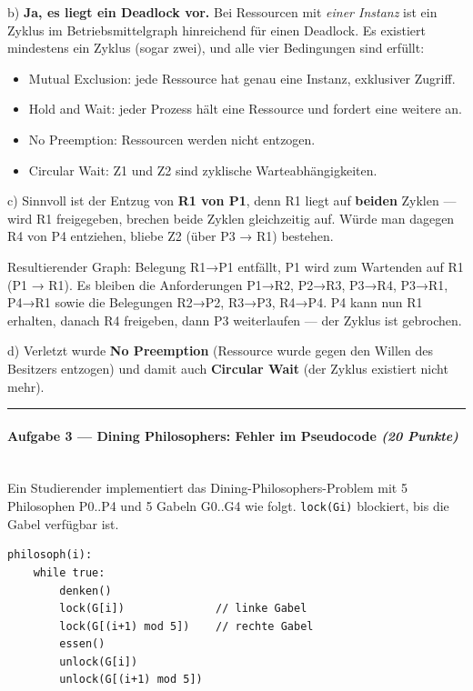 \documentclass[11pt, a4paper]{article}
\begin{document}
b) \textbf{Ja, es liegt ein Deadlock vor.} Bei Ressourcen mit \textit{einer Instanz} ist ein Zyklus im Betriebsmittelgraph hinreichend für einen Deadlock. Es existiert mindestens ein Zyklus (sogar zwei), und alle vier Bedingungen sind erfüllt:

\begin{itemize}
  \item Mutual Exclusion: jede Ressource hat genau eine Instanz, exklusiver Zugriff.
  \item Hold and Wait: jeder Prozess hält eine Ressource und fordert eine weitere an.
  \item No Preemption: Ressourcen werden nicht entzogen.
  \item Circular Wait: Z1 und Z2 sind zyklische Warteabhängigkeiten.
\end{itemize}

c) Sinnvoll ist der Entzug von \textbf{R1 von P1}, denn R1 liegt auf \textbf{beiden} Zyklen — wird R1 freigegeben, brechen beide Zyklen gleichzeitig auf. Würde man dagegen R4 von P4 entziehen, bliebe Z2 (über P3 → R1) bestehen.


Resultierender Graph: Belegung R1→P1 entfällt, P1 wird zum Wartenden auf R1 (P1 → R1). Es bleiben die Anforderungen P1→R2, P2→R3, P3→R4, P3→R1, P4→R1 sowie die Belegungen R2→P2, R3→P3, R4→P4. P4 kann nun R1 erhalten, danach R4 freigeben, dann P3 weiterlaufen — der Zyklus ist gebrochen.


d) Verletzt wurde \textbf{No Preemption} (Ressource wurde gegen den Willen des Besitzers entzogen) und damit auch \textbf{Circular Wait} (der Zyklus existiert nicht mehr).



\noindent\textcolor{rulegray}{\rule{\linewidth}{0.4pt}}


\paragraph{Aufgabe 3 — Dining Philosophers: Fehler im Pseudocode \textit{(20 Punkte)}}\mbox{}\\[2pt]

Ein Studierender implementiert das Dining-Philosophers-Problem mit 5 Philosophen P0..P4 und 5 Gabeln G0..G4 wie folgt. \texttt{lock(Gi)} blockiert, bis die Gabel verfügbar ist.


\begin{lstlisting}
philosoph(i):
    while true:
        denken()
        lock(G[i])              // linke Gabel
        lock(G[(i+1) mod 5])    // rechte Gabel
        essen()
        unlock(G[i])
        unlock(G[(i+1) mod 5])
\end{lstlisting}
\end{document}

